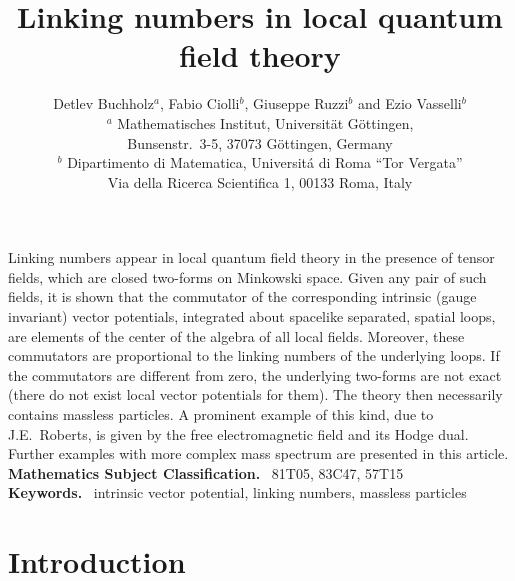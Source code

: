 \documentclass[11pt]{article}
\numberwithin{equation}{section}
\begin{document}
 

%

\title{\LARGE Linking numbers in local quantum field theory}
\author{Detlev Buchholz${}^a$,
Fabio Ciolli${}^b$, Giuseppe Ruzzi${}^b$ and   
Ezio Vasselli${}^b$ \\[20pt]
\small  
${}^a$ Mathematisches Institut, Universit\"at G\"ottingen, \\
\small Bunsenstr.\ 3-5, 37073 G\"ottingen, Germany\\[5pt]
\small
${}^b$ 
Dipartimento di Matematica, Universit\'a di Roma ``Tor Vergata'' \\
\small Via della Ricerca Scientifica 1, 00133 Roma, Italy \\
}
\date{}

\maketitle


{\small 
    Linking numbers appear in local quantum field theory in the 
    presence of tensor fields, which are closed two-forms on Minkowski space.
    Given any pair of such fields, it is shown that the commutator of 
    the corresponding intrinsic (gauge invariant) vector potentials, 
    integrated about spacelike separated, spatial loops, 
    are elements of the center of the algebra of all local fields. 
    Moreover, these 
    commutators are proportional to the linking numbers of the underlying 
    loops. If the commutators 
    are different from zero, the underlying two-forms are not exact 
    (there do not exist local vector potentials for them). 
    The theory then necessarily contains massless particles.
    A prominent example of this kind, due to J.E.~Roberts, is given 
    by the free electromagnetic field and its Hodge dual. Further 
    examples with more complex mass spectrum
    are presented in this article. 
  } \\[2mm]
{\bf Mathematics Subject Classification.}  \  81T05, 83C47, 57T15
 \\[2mm]
{\bf Keywords.} \ intrinsic vector potential, linking
numbers, massless particles 

%
\section{Introduction}
\end{document}

